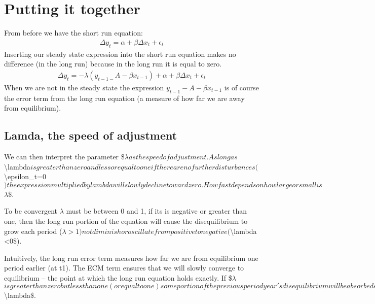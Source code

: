 \documentclass[letterpaper,10pt,english]{jupyterBook}
\begin{document}
\section{Putting it together}
\label{\detokenize{content/06_WBModels/LoadingWBModel:putting-it-together}}
\sphinxAtStartPar
From before we have the short run equation:
\begin{equation*}
\begin{split} \Delta y_t = \alpha + \beta \Delta x_t +\epsilon_t \end{split}
\end{equation*}
\sphinxAtStartPar
Inserting our steady state expression into the short run equation makes no difference (in the long run) because in the long run it is equal to zero.
\begin{equation*}
\begin{split} \Delta y_t = -\lambda(y_{t-1-}A-βx_{t-1})  + \alpha + \beta \Delta x_t +\epsilon_t \end{split}
\end{equation*}
\sphinxAtStartPar
When we are not in the steady state the expression \( y_{t-1}-A-βx_{t-1} \) is of course the error term from the long run equation (a measure of how far we are away from equilibrium).


\subsection{Lamda, the speed of adjustment}
\label{\detokenize{content/06_WBModels/LoadingWBModel:lamda-the-speed-of-adjustment}}
\sphinxAtStartPar
We can then interpret the parameter \$\( \lambda \)\( as the  speed of adjustment.  As long as \)\textbackslash{}lambda\( is greater than zero and less or equal to one if there are no further disturbances ( \)\textbackslash{}epsilon\_t=0\() the expression multiplied by lambda will slowly decline toward zero. How fast depends on how large or small is \)\(\lambda\)\$.

\sphinxAtStartPar
To be convergent \(\lambda\) must be between 0 and 1, if its is negative or greater than one, then the long run portion of the equation will cause the disequilibrium to grow each period (\(\lambda >1) not diminish or oscillate from positive to negative (\)\textbackslash{}lambda <0\$).

\sphinxAtStartPar
Intuitively, the long run error term measures how far we are from equilibrium one period earlier (at t\sphinxhyphen{}1). The ECM term ensures that we will slowly converge to equilibrium – the point at which the long run equation holds exactly. If \$\(\lambda\)\( is greater than zero but less than one (or equal to one) some portion of the previous period year's disequilibrium will be absorbed each year. How much is absorbed depends on the size of estimated speed of the adjustment coefficient \)\textbackslash{}lambda\$. 
\end{document}
